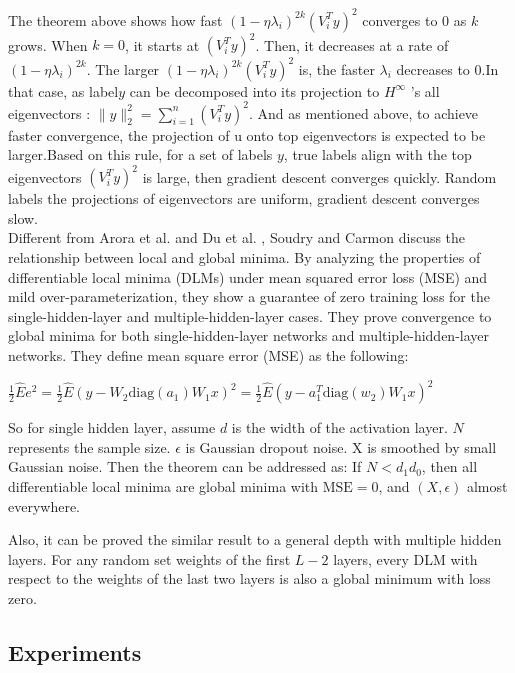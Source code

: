 \documentclass{article}
\begin{document}
The theorem above shows how fast $(1-\eta\lambda_i)^{2k} (V_i^T y)^2$ converges to 0 as $k$ grows. When $k = 0$, it starts at $(V_i^T y)^2$. Then, it decreases at a rate of $(1-\eta\lambda_i)^{2k}$. The larger $(1-\eta\lambda_i)^{2k} (V_i^T y)^2$ is, the faster $\lambda_i$ decreases to 0.In that case, as label$y$ can be decomposed into its projection to $H^{\infty}$ 's all eigenvectors : $\|y\|_2^2 = \sum_{i=1}^n{(V_i^T y)^2}$. And as mentioned above, to achieve faster convergence, the projection of u onto top eigenvectors is expected to be larger.Based on this rule,
for a set of labels $y$, true labels align with the top eigenvectors $(V_i^T y)^2$ is large, then gradient descent converges quickly. Random labels the projections of eigenvectors are uniform, gradient descent converges slow. \\

\indent Different from Arora et al. \cite{Arora} and Du et al. \cite{SimonDu}, Soudry and Carmon \cite{SoudryCarmon} discuss the relationship between local and global minima. By analyzing the properties of differentiable local minima (DLMs) under mean squared error loss (MSE) and mild over-parameterization, they show a guarantee of zero training loss for the single-hidden-layer and multiple-hidden-layer cases. They prove convergence to global minima for both single-hidden-layer networks and multiple-hidden-layer networks. They define mean square error (MSE) as the following:

\begin{center}
    $\frac{1}{2}\hat{E}e^2 = \frac{1}{2}\hat{E}(y-W_2 \text{diag}(a_1)W_1x)^2 = \frac{1}{2}\hat{E}(y-a_1^T \text{diag}(w_2)W_1x)^2$
\end{center}

So for single hidden layer, assume $d$ is the width of the activation layer. $N$ represents the sample size. $\epsilon$ is Gaussian dropout noise. X is  smoothed by small Gaussian noise. Then the theorem can be addressed as:
If $N< d_1 d_0$, then all differentiable local minima are global minima with $\text{MSE} = 0$, and $(X,\epsilon)$ almost everywhere. 

Also, it can be proved the similar result to a general depth with multiple hidden layers.
For any random set weights of the first $L-2$ layers, every DLM with respect to the weights of the last two layers is also a global minimum with loss zero. 


\subsection{Experiments}
\end{document}
